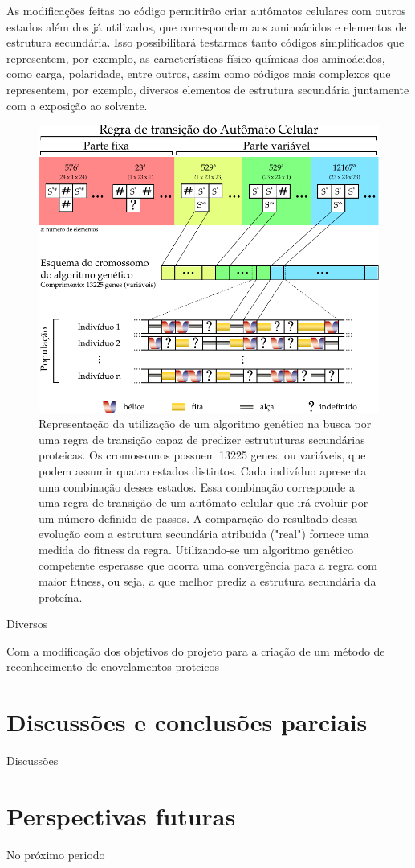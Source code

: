As modificações feitas no código permitirão criar autômatos celulares com outros estados além dos já utilizados, que correspondem aos aminoácidos e  elementos de estrutura secundária. Isso possibilitará testarmos tanto códigos simplificados que representem, por exemplo, as características físico-químicas dos aminoácidos, como carga, polaridade, entre outros, assim como códigos mais complexos que representem, por exemplo, diversos elementos de estrutura secundária juntamente com a exposição ao solvente.

\begin{figure}[h]
	\includegraphics[width=1\linewidth]{ca_ga_final}
	\caption{Representação da utilização de um algoritmo genético na busca por uma regra de transição capaz de predizer estrututuras secundárias proteicas. Os cromossomos possuem 13225 genes, ou variáveis, que podem assumir quatro estados distintos. Cada indivíduo apresenta uma combinação desses estados. Essa combinação corresponde a uma regra de transição de um autômato celular que irá evoluir por um número definido de passos. A comparação do resultado dessa evolução com a estrutura secundária atribuída ("real") fornece uma medida do fitness da regra. Utilizando-se um algoritmo genético competente esperasse que ocorra uma convergência para a regra com maior fitness, ou seja, a que melhor prediz a estrutura secundária da proteína.}
		\label{fig:ca_ga}
\end{figure}

Diversos 



Com a modificação dos objetivos do projeto para a criação de um método de reconhecimento de enovelamentos proteicos
\section{Discussões e conclusões parciais}
Discussões 
\section{Perspectivas futuras}
No próximo periodo
